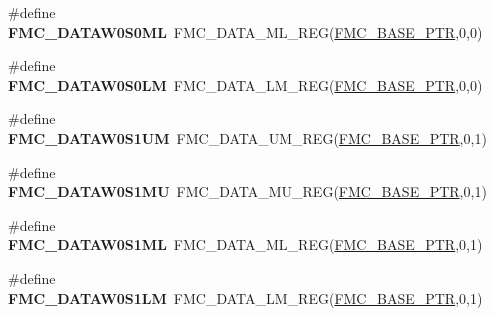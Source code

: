 \begin{DoxyCompactItemize}
\item 
\hypertarget{group___f_m_c___register___accessor___macros_ga73c0eea899defbfad1ac0f8e785af841}{}\#define {\bfseries F\+M\+C\+\_\+\+D\+A\+T\+A\+W0\+S0\+M\+L}~F\+M\+C\+\_\+\+D\+A\+T\+A\+\_\+\+M\+L\+\_\+\+R\+E\+G(\hyperlink{group___f_m_c___peripheral_ga0a740437b573e32e6b932bf729485fd9}{F\+M\+C\+\_\+\+B\+A\+S\+E\+\_\+\+P\+T\+R},0,0)\label{group___f_m_c___register___accessor___macros_ga73c0eea899defbfad1ac0f8e785af841}

\item 
\hypertarget{group___f_m_c___register___accessor___macros_gaab16ccf848b3474904ab11c685a52d8f}{}\#define {\bfseries F\+M\+C\+\_\+\+D\+A\+T\+A\+W0\+S0\+L\+M}~F\+M\+C\+\_\+\+D\+A\+T\+A\+\_\+\+L\+M\+\_\+\+R\+E\+G(\hyperlink{group___f_m_c___peripheral_ga0a740437b573e32e6b932bf729485fd9}{F\+M\+C\+\_\+\+B\+A\+S\+E\+\_\+\+P\+T\+R},0,0)\label{group___f_m_c___register___accessor___macros_gaab16ccf848b3474904ab11c685a52d8f}

\item 
\hypertarget{group___f_m_c___register___accessor___macros_ga7e5152396273a5ee77938f383ca06218}{}\#define {\bfseries F\+M\+C\+\_\+\+D\+A\+T\+A\+W0\+S1\+U\+M}~F\+M\+C\+\_\+\+D\+A\+T\+A\+\_\+\+U\+M\+\_\+\+R\+E\+G(\hyperlink{group___f_m_c___peripheral_ga0a740437b573e32e6b932bf729485fd9}{F\+M\+C\+\_\+\+B\+A\+S\+E\+\_\+\+P\+T\+R},0,1)\label{group___f_m_c___register___accessor___macros_ga7e5152396273a5ee77938f383ca06218}

\item 
\hypertarget{group___f_m_c___register___accessor___macros_gab0eaa1ac28dbc9616a7d9792ebd560cc}{}\#define {\bfseries F\+M\+C\+\_\+\+D\+A\+T\+A\+W0\+S1\+M\+U}~F\+M\+C\+\_\+\+D\+A\+T\+A\+\_\+\+M\+U\+\_\+\+R\+E\+G(\hyperlink{group___f_m_c___peripheral_ga0a740437b573e32e6b932bf729485fd9}{F\+M\+C\+\_\+\+B\+A\+S\+E\+\_\+\+P\+T\+R},0,1)\label{group___f_m_c___register___accessor___macros_gab0eaa1ac28dbc9616a7d9792ebd560cc}

\item 
\hypertarget{group___f_m_c___register___accessor___macros_ga83fa4cae1df31dbd1f7df47efdfd9cd0}{}\#define {\bfseries F\+M\+C\+\_\+\+D\+A\+T\+A\+W0\+S1\+M\+L}~F\+M\+C\+\_\+\+D\+A\+T\+A\+\_\+\+M\+L\+\_\+\+R\+E\+G(\hyperlink{group___f_m_c___peripheral_ga0a740437b573e32e6b932bf729485fd9}{F\+M\+C\+\_\+\+B\+A\+S\+E\+\_\+\+P\+T\+R},0,1)\label{group___f_m_c___register___accessor___macros_ga83fa4cae1df31dbd1f7df47efdfd9cd0}

\item 
\hypertarget{group___f_m_c___register___accessor___macros_ga255bf460bb2e604c674daf5416a3baf5}{}\#define {\bfseries F\+M\+C\+\_\+\+D\+A\+T\+A\+W0\+S1\+L\+M}~F\+M\+C\+\_\+\+D\+A\+T\+A\+\_\+\+L\+M\+\_\+\+R\+E\+G(\hyperlink{group___f_m_c___peripheral_ga0a740437b573e32e6b932bf729485fd9}{F\+M\+C\+\_\+\+B\+A\+S\+E\+\_\+\+P\+T\+R},0,1)\label{group___f_m_c___register___accessor___macros_ga255bf460bb2e604c674daf5416a3baf5}


\end{DoxyCompactItemize}
